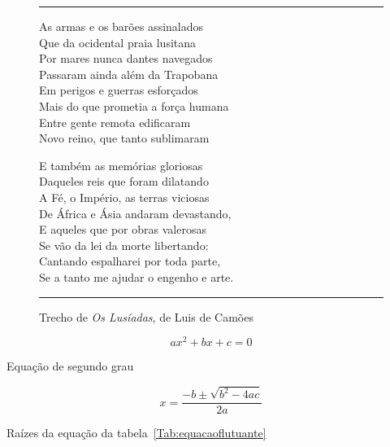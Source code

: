 \begin{figure}[tbp]
\caption{Trecho de \emph{Os Lusíadas}, de Luis de Camões}
\label{Fig:textoflutuante}
\hrule
\begin{minipage}{0.45\linewidth}
\begin{flushleft}
As armas e os barões assinalados\\
Que da ocidental praia lusitana\\
Por mares nunca dantes navegados\\
Passaram ainda além da Trapobana\\
Em perigos e guerras esforçados\\
Mais do que prometia a força humana\\
Entre gente remota edificaram\\
Novo reino, que tanto sublimaram
\end{flushleft}
\end{minipage}
\hfill
\begin{minipage}{0.45\linewidth}
\begin{flushright}
E também as memórias gloriosas\\
Daqueles reis que foram dilatando\\
A Fé, o Império, as terras viciosas\\
De África e Ásia andaram devastando,\\
E aqueles que por obras valerosas\\
Se vão da lei da morte libertando:\\
Cantando espalharei por toda parte,\\
Se a tanto me ajudar o engenho e arte.
\end{flushright}
\end{minipage}
\hrule
\end{figure}

\begin{table}[bp]
\begin{minipage}[b]{0.45\linewidth}
\begin{center}
\[
ax^2 + bx + c = 0
\]
\end{center}
\caption{Equação de segundo grau}
\label{Tab:equacaoflutuante}
\end{minipage}
\hfill
\begin{minipage}[b]{0.50\linewidth}
\begin{center}
\[
x = \frac{-b\pm\sqrt{b^2-4ac}}{2a}
\]
\end{center}
\caption{Raízes da equação da tabela~\ref{Tab:equacaoflutuante}}
\label{Tab:equacaoflutuante2}
\end{minipage}
\end{table}

